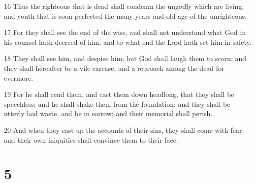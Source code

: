\par 16 Thus the righteous that is dead shall condemn the ungodly which are living; and youth that is soon perfected the many years and old age of the unrighteous.
\par 17 For they shall see the end of the wise, and shall not understand what God in his counsel hath decreed of him, and to what end the Lord hath set him in safety.
\par 18 They shall see him, and despise him; but God shall laugh them to scorn: and they shall hereafter be a vile carcase, and a reproach among the dead for evermore.
\par 19 For he shall rend them, and cast them down headlong, that they shall be speechless; and he shall shake them from the foundation; and they shall be utterly laid waste, and be in sorrow; and their memorial shall perish.
\par 20 And when they cast up the accounts of their sins, they shall come with fear: and their own iniquities shall convince them to their face.

\chapter{5}

